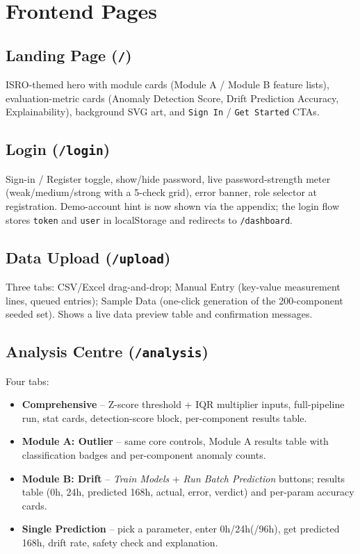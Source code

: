 \documentclass[11pt,a4paper]{article}
\newcommand{\code}[1]{\texttt{\small #1}}
\begin{document}
\section{Frontend Pages}
\label{sec:ui}

\subsection{Landing Page (\code{/})}
ISRO-themed hero with module cards (Module A / Module B feature lists), evaluation-metric cards
(Anomaly Detection Score, Drift Prediction Accuracy, Explainability), background SVG art, and
\code{Sign In} / \code{Get Started} CTAs.

\subsection{Login (\code{/login})}
Sign-in / Register toggle, show/hide password, live password-strength meter (weak/medium/strong
with a 5-check grid), error banner, role selector at registration. Demo-account hint is now
shown via the appendix; the login flow stores \code{token} and \code{user} in localStorage and
redirects to \code{/dashboard}.

\subsection{Data Upload (\code{/upload})}
Three tabs: CSV/Excel drag-and-drop; Manual Entry (key-value measurement lines, queued
entries); Sample Data (one-click generation of the 200-component seeded set). Shows a live data
preview table and confirmation messages.

\subsection{Analysis Centre (\code{/analysis})}
Four tabs:
\begin{itemize}[leftmargin=1.5em]
  \item \textbf{Comprehensive} -- Z-score threshold + IQR multiplier inputs, full-pipeline run,
        stat cards, detection-score block, per-component results table.
  \item \textbf{Module A: Outlier} -- same core controls, Module A results table with
        classification badges and per-component anomaly counts.
  \item \textbf{Module B: Drift} -- \textit{Train Models} + \textit{Run Batch Prediction}
        buttons; results table (0h, 24h, predicted 168h, actual, error, verdict) and per-param
        accuracy cards.
  \item \textbf{Single Prediction} -- pick a parameter, enter 0h/24h(/96h), get predicted 168h,
        drift rate, safety check and explanation.
\end{itemize}
\end{document}
